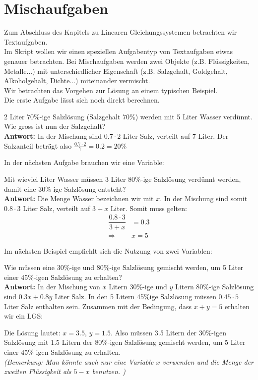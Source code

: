 \documentclass[11pt,oneside]{article}
\begin{document}
\section{Mischaufgaben}
Zum Abschluss des Kapitels zu Linearen Gleichungssystemen betrachten wir Textaufgaben.\\
Im Skript wollen wir einen speziellen Aufgabentyp von Textaufgaben etwas genauer betrachten. Bei Mischaufgaben werden zwei Objekte (z.B. Flüssigkeiten, Metalle...)  mit unterschiedlicher Eigenschaft (z.B. Salzgehalt, Goldgehalt, Alkoholgehalt, Dichte...) miteinander vermischt.
\\
Wir betrachten das Vorgehen zur Lösung an einem typischen Beispiel.\\
Die erste Aufgabe lässt sich noch direkt berechnen.
\begin{beispiel}
	2 Liter 70\%-ige Salzlösung (Salzgehalt 70\%) werden mit 5 Liter Wasser verdünnt. Wie gross ist nun der Salzgehalt?\\
	\textbf{Antwort: } In der Mischung sind $0.7\cdot 2$ Liter Salz, verteilt auf 7 Liter.
	Der Salzanteil beträgt also $\frac{0.7\cdot 2}{7}=0.2=20\%$
\end{beispiel}
\noindent
In der nächsten Aufgabe brauchen wir eine Variable:
\begin{beispiel}
	Mit wieviel Liter Wasser müssen 3 Liter 80\%-ige Salzlösung verdünnt werden, damit eine 30\%-ige Salzlösung entsteht?\\
	\textbf{Antwort: } Die Menge Wasser bezeichnen wir mit $x$. In der Mischung sind somit $0.8\cdot 3$ Liter Salz, verteilt auf $3+x$ Liter. Somit muss gelten:
	\begin{align*}
		\dfrac{0.8\cdot 3}{3+x}&=0.3 \\
		\Rightarrow& x=5
	\end{align*}
\end{beispiel}
\noindent
Im nächsten Beispiel empfiehlt sich die Nutzung von zwei Variablen:
\begin{beispiel}
	Wie müssen eine 30\%-ige und 80\%-ige Salzlösung gemischt werden, um 5 Liter einer 45\%-igen Salzlösung zu erhalten?\\
	\textbf{Antwort: } In der Mischung von $x$ Litern 30\%-ige und $y$ Litern 80\%-ige Salzlösung sind $0.3x+0.8y$ Liter Salz. In den 5 Litern 45\%ige Salzlösung müssen $0.45\cdot 5$ Liter Salz enthalten sein. Zusammen mit der Bedingung, dass $x+y=5$ erhalten wir ein LGS:
	\begin{center}
	\end{center}
	Die Lösung lautet: $x=3.5$, $y=1.5$. Also müssen 3.5 Litern der 30\%-igen Salzlösung mit 1.5 Litern der 80\%-igen Salzlösung gemischt werden, um 5 Liter einer 45\%-igen Salzlösung zu erhalten.\\
	\emph{(Bemerkung: Man könnte auch nur eine Variable $x$ verwenden und die Menge der zweiten Flüssigkeit als $5-x$ benutzen. )}
\end{beispiel}
\end{document}
